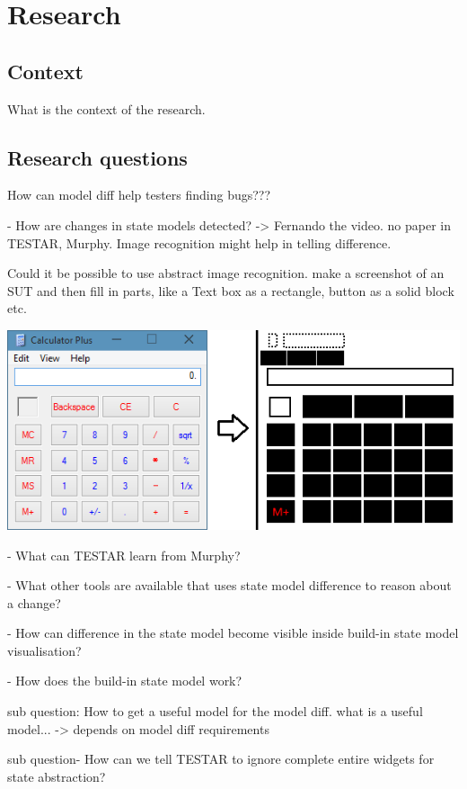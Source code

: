 \section{Research}

\subsection{Context}
What is the context of the research. 

\subsection{Research questions}


How can model diff help testers finding bugs???

- How are changes in state models detected? -> Fernando the video. no paper in TESTAR, Murphy. Image recognition might help in telling difference. 

Could it be possible to use abstract image recognition. make a screenshot of an SUT and then fill in parts, like a Text box as a rectangle, button as a solid block etc. 

\includegraphics{document/pics/abstract-ui.png}

- What can TESTAR learn from Murphy?

- What other tools are available that uses state model difference to reason about a change? 

- How can difference in the state model become visible inside build-in state model visualisation?

- How does the build-in state model work?

sub question: How to get a useful model for the model diff.
what is a useful model... -> depends on model diff requirements

sub question- How can we tell TESTAR to ignore complete entire widgets for state abstraction?

